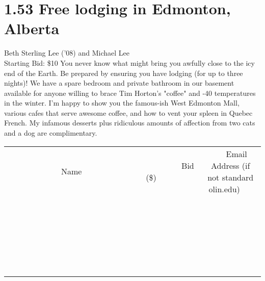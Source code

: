 \documentclass[11pt]{article}
\begin{document}
\section*{1.53 Free lodging in Edmonton, Alberta}
Beth Sterling Lee ('08) and Michael Lee
\\
Starting Bid: \$10
\newline
You never know what might bring you awfully close to the icy end of the Earth. Be prepared by ensuring you have lodging (for up to three nights)!  We have a spare bedroom and private bathroom in our basement available for anyone willing to brace Tim Horton's "coffee" and -40 temperatures in the winter. I'm happy to show you the famous-ish West Edmonton Mall, various cafes that serve awesome coffee, and how to vent your spleen in Quebec French. My infamous desserts plus ridiculous amounts of affection from two cats and a dog are complimentary.
\\[6ex]
\begin{tabular}{c c c}
~~~~~~~~~~~~~Name~~~~~~~~~~~~~ & ~~~~~~~~~Bid (\$)~~~~~~~~~  & ~~~Email Address (if not standard olin.edu)~~~\\
 & & \\
\hline
 & & \\
\hline
 & & \\
\hline
 & & \\
\hline
 & & \\
\hline
 & & \\
\hline
 & & \\
\hline
 & & \\
\hline
 & & \\
\hline
 & & \\
\hline
 & & \\
\hline
 & & \\
\hline
 & & \\
\hline
 & & \\
\hline
 & & \\
\hline
 & & \\
\hline
 & & \\
\hline
 & & \\
\hline
 & & \\
\hline
 & & \\
\hline
 & & \\
\hline
 & & \\
\hline
 & & \\
\hline
 & & \\
\hline
 & & \\
\hline
 & & \\
\hline
\end{tabular}
\newpage
\end{document}
